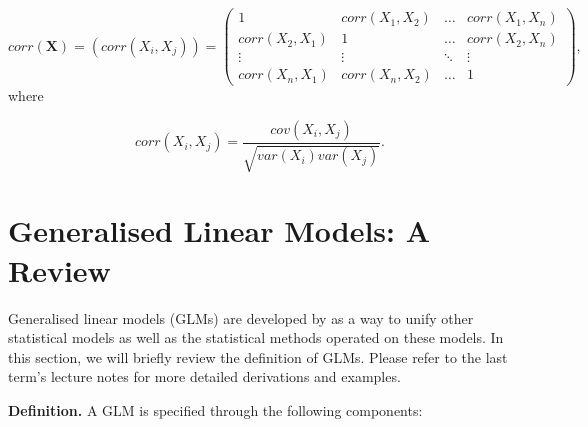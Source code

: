 \documentclass[
  12pt,
]{book}
\begin{document}
\[
corr(\boldsymbol{X}) = (corr(X_i, X_j)) =
\left(\begin{array}{cccc} 1              & corr(X_1, X_2) & \ldots & corr(X_1, X_n) \\
                          corr(X_2, X_1) & 1              & \ldots & corr(X_2, X_n) \\
                          \vdots         & \vdots         & \ddots & \vdots         \\
                          corr(X_n, X_1) & corr(X_n, X_2) & \ldots & 1 \end{array}\right),
\]
where

\[corr(X_i, X_j) = \frac{cov(X_i, X_j)}{\sqrt{var(X_i) var(X_j)}}.\]

\section{Generalised Linear Models: A Review}\label{generalised-linear-models-a-review}

Generalised linear models (GLMs) are developed by \citet{nelder1972generalized} as a way to unify other statistical models as well as the statistical methods operated on these models. In this section, we will briefly review the definition of GLMs. Please refer to the last term's lecture notes for more detailed derivations and examples.

\textbf{Definition.} A GLM is specified through the following components:
\end{document}

